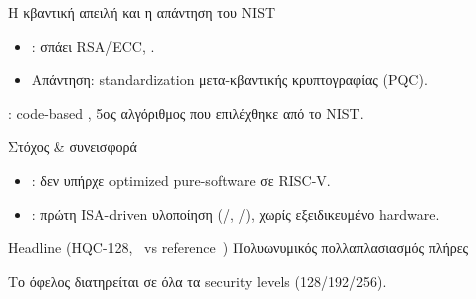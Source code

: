 \documentclass[aspectratio=169,10pt]{beamer}
\begin{document}
\begin{frame}{Η κβαντική απειλή και η απάντηση του NIST}
  \begin{itemize}
    \item {}: σπάει RSA/ECC, .
    \item Απάντηση: standardization μετα-κβαντικής κρυπτογραφίας (PQC).
  \end{itemize}
  \vspace{0.4em}
  \begin{center}
  \end{center}
  \vspace{0.2em}
  {\footnotesize \HQC: code-based \KEM, 5ος αλγόριθμος που επιλέχθηκε από το NIST.\par}
  \cite{Shor1997,NIST-HQC-selection2025}
\end{frame}

\begin{frame}{Στόχος \& συνεισφορά}
  \begin{itemize}
    \item {}: δεν υπήρχε optimized pure-software \HQC σε RISC-V.
    \item {}: πρώτη ISA-driven υλοποίηση (\Zbc/\Zvbc, \Zbb/\Zvbb),
          χωρίς εξειδικευμένο hardware.
  \end{itemize}
  \begin{block}{Headline (HQC-128, \instret\ vs reference~\cite{HQC-reference-impl})}
    Πολυωνυμικός πολλαπλασιασμός  \quad\textbar\quad πλήρες \KEM\ 
  \end{block}
  \centering\footnotesize\textcolor{neutral}{Το όφελος διατηρείται σε όλα τα security levels (128/192/256).}
\end{frame}
\end{document}

